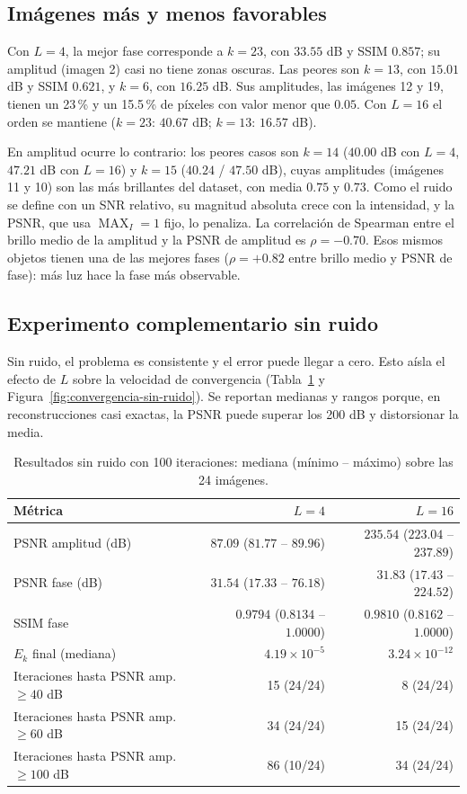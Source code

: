 \documentclass[11pt,a4paper]{article}
\begin{document}
\subsection{Imágenes más y menos favorables}

Con $L=4$, la mejor fase corresponde a $k=23$, con $33.55$ dB y SSIM $0.857$; su amplitud (imagen 2) casi no tiene zonas oscuras. Las peores son $k=13$, con $15.01$ dB y SSIM $0.621$, y $k=6$, con $16.25$ dB. Sus amplitudes, las imágenes 12 y 19, tienen un 23\,\% y un 15.5\,\% de píxeles con valor menor que $0.05$. Con $L=16$ el orden se mantiene ($k=23$: $40.67$ dB; $k=13$: $16.57$ dB).

En amplitud ocurre lo contrario: los peores casos son $k=14$ ($40.00$ dB con $L=4$, $47.21$ dB con $L=16$) y $k=15$ ($40.24$ / $47.50$ dB), cuyas amplitudes (imágenes 11 y 10) son las más brillantes del dataset, con media $0.75$ y $0.73$. Como el ruido se define con un SNR relativo, su magnitud absoluta crece con la intensidad, y la PSNR, que usa $\operatorname{MAX}_I=1$ fijo, lo penaliza. La correlación de Spearman entre el brillo medio de la amplitud y la PSNR de amplitud es $\rho=-0.70$. Esos mismos objetos tienen una de las mejores fases ($\rho=+0.82$ entre brillo medio y PSNR de fase): más luz hace la fase más observable.

\subsection{Experimento complementario sin ruido}

Sin ruido, el problema es consistente y el error puede llegar a cero. Esto aísla el efecto de $L$ sobre la velocidad de convergencia (Tabla~\ref{tab:sin-ruido} y Figura~\ref{fig:convergencia-sin-ruido}). Se reportan medianas y rangos porque, en reconstrucciones casi exactas, la PSNR puede superar los 200 dB y distorsionar la media.

\begin{table}[H]
\centering
\caption{Resultados sin ruido con 100 iteraciones: mediana (mínimo -- máximo) sobre las 24 imágenes.}
\label{tab:sin-ruido}
\small
\begin{tabular}{lrr}
\toprule
Métrica & $L=4$ & $L=16$ \\
\midrule
PSNR amplitud (dB) & $87.09$ ($81.77$ -- $89.96$) & $235.54$ ($223.04$ -- $237.89$) \\
PSNR fase (dB) & $31.54$ ($17.33$ -- $76.18$) & $31.83$ ($17.43$ -- $224.52$) \\
SSIM fase & $0.9794$ ($0.8134$ -- $1.0000$) & $0.9810$ ($0.8162$ -- $1.0000$) \\
$E_k$ final (mediana) & $4.19\times10^{-5}$ & $3.24\times10^{-12}$ \\
\midrule
Iteraciones hasta PSNR amp.\ $\geq40$ dB & 15 (24/24) & 8 (24/24) \\
Iteraciones hasta PSNR amp.\ $\geq60$ dB & 34 (24/24) & 15 (24/24) \\
Iteraciones hasta PSNR amp.\ $\geq100$ dB & 86 (10/24) & 34 (24/24) \\
\bottomrule
\end{tabular}
\end{table}
\end{document}
